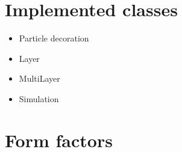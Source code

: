 

\chapter{Implemented classes}

\begin{itemize}
\item Particle decoration
\item Layer
\item MultiLayer
\item Simulation
\end{itemize}

\chapter{Form factors}

